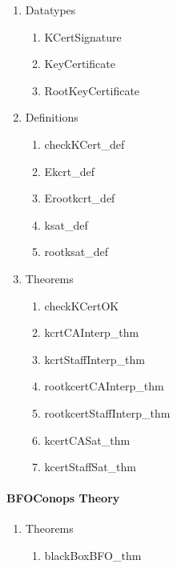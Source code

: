 \documentclass[10pt,twoside]{article}
\begin{document}
\begin{enumerate}
\item Datatypes
  \begin{enumerate}[{a.}]
  \item KCertSignature
  \item KeyCertificate
  \item RootKeyCertificate
  \end{enumerate}

\item Definitions
  \begin{enumerate}[{a.}]
  \item checkKCert\_def
  \item Ekcrt\_def
  \item Erootkcrt\_def
  \item ksat\_def
  \item rootksat\_def
  \end{enumerate}

\item Theorems
  \begin{enumerate}[{a.}]
  \item checkKCertOK
  \item kcrtCAInterp\_thm
  \item kcrtStaffInterp\_thm
  \item rootkcertCAInterp\_thm
  \item rootkcertStaffInterp\_thm
  \item kcertCASat\_thm
  \item kcertStaffSat\_thm
  \end{enumerate}

\end{enumerate}

\paragraph{BFOConops Theory}

\begin{enumerate}
\item Theorems
  \begin{enumerate}[{a.}]
  \item blackBoxBFO\_thm
  \end{enumerate}

\end{enumerate}




\newpage{}
\end{document}
